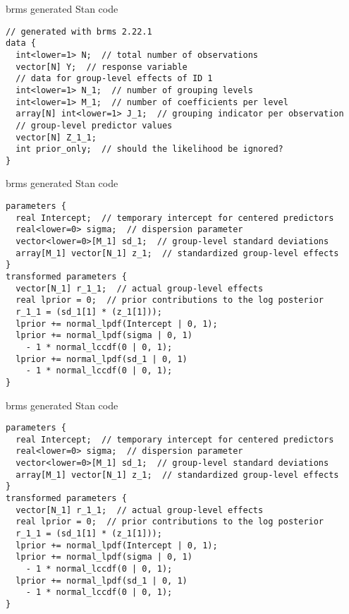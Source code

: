 \documentclass[finnish,english,t]{beamer}
\begin{document}
\begin{frame}[fragile]{brms generated Stan code}

  \vspace{-\baselineskip}
\begin{verbatim}
// generated with brms 2.22.1
data {
  int<lower=1> N;  // total number of observations
  vector[N] Y;  // response variable
  // data for group-level effects of ID 1
  int<lower=1> N_1;  // number of grouping levels
  int<lower=1> M_1;  // number of coefficients per level
  array[N] int<lower=1> J_1;  // grouping indicator per observation
  // group-level predictor values
  vector[N] Z_1_1;
  int prior_only;  // should the likelihood be ignored?
}
\end{verbatim}
  
\end{frame}

\begin{frame}[fragile]{brms generated Stan code}

  \vspace{-\baselineskip}
\begin{verbatim}
parameters {
  real Intercept;  // temporary intercept for centered predictors
  real<lower=0> sigma;  // dispersion parameter
  vector<lower=0>[M_1] sd_1;  // group-level standard deviations
  array[M_1] vector[N_1] z_1;  // standardized group-level effects
}
transformed parameters {
  vector[N_1] r_1_1;  // actual group-level effects
  real lprior = 0;  // prior contributions to the log posterior
  r_1_1 = (sd_1[1] * (z_1[1]));
  lprior += normal_lpdf(Intercept | 0, 1);
  lprior += normal_lpdf(sigma | 0, 1)
    - 1 * normal_lccdf(0 | 0, 1);
  lprior += normal_lpdf(sd_1 | 0, 1)
    - 1 * normal_lccdf(0 | 0, 1);
}
\end{verbatim}
  
\end{frame}

\begin{frame}[fragile]{brms generated Stan code}

  \vspace{-\baselineskip}
\begin{verbatim}
parameters {
  real Intercept;  // temporary intercept for centered predictors
  real<lower=0> sigma;  // dispersion parameter
  vector<lower=0>[M_1] sd_1;  // group-level standard deviations
  array[M_1] vector[N_1] z_1;  // standardized group-level effects
}
transformed parameters {
  vector[N_1] r_1_1;  // actual group-level effects
  real lprior = 0;  // prior contributions to the log posterior
  r_1_1 = (sd_1[1] * (z_1[1]));
  lprior += normal_lpdf(Intercept | 0, 1);
  lprior += normal_lpdf(sigma | 0, 1)
    - 1 * normal_lccdf(0 | 0, 1);
  lprior += normal_lpdf(sd_1 | 0, 1)
    - 1 * normal_lccdf(0 | 0, 1);
}
\end{verbatim}
  
\end{frame}
\end{document}
